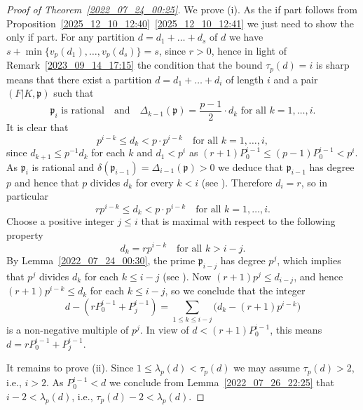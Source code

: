 \documentclass[12pt,reqno]{amsart}%
\theoremstyle{definition}
\newtheorem{rem}[prop]{Remark}
\theoremstyle{remark}
\newcommand{\ov}{\overline}
\newcommand{\pp}{\mathfrak{p}}
\newcommand{\de}{\delta}
\newcommand{\De}{\Delta}
\newcommand{\lam}{\lambda}
\begin{document}
\begin{proof}[Proof of Theorem~\ref{2022_07_24_00:25}]
We prove (i). As the if part follows from Proposition~\ref{2025_12_10_12:40}~\ref{2025_12_10_12:41} we just need to show the only if part.
For any partition
$ d = d_1 + \dots + d_s $
of $d$
we have $s+\min\{v_p(d_1),\dots,v_p(d_s)\}=s$,
since $r>0$,
hence in light of Remark~\ref{2023_09_14_17:15} 
the condition that the bound $\tau_p(d)=i$ is sharp means that there exist a partition
$ d = d_1 + \dots + d_i $
of length $i$ and a pair $(F|K,\pp)$ such that
\[ \text{$\pp_i$ is rational} \quad \text{and} \quad \De_{k-1}(\pp) = \frac{p-1}{2} \cdot d_{k} \text{ for all $k = 1,\dots,i$}. \]
It is clear that
\[ p^{i-k} \leq d_k < p \cdot p^{i-k} \quad \text{for all $k=1,\dots,i$}, \]
since $d_{k+1} \leq p^{-1} d_k$ for each $k$ and $d_1<p^i$ as $(r+1)P_0^{i-1} \leq (p-1)P_0^{i-1} < p^i$.
As $\pp_{i}$ is rational and $\de(\pp_{i-1})=\De_{i-1}(\pp) > 0$ we deduce that $\pp_{i-1}$ has degree $p$ and hence that $p$ divides $d_{k}$ for every $k<i$ (see \cite[Proposition~2.8]{HiSt22}).
Therefore $d_i=r$, so in particular
\[ r p^{i-k} \leq d_k < p \cdot p^{i-k} \quad \text{for all $k=1,\dots,i$.} \]
Choose a positive integer $j\leq i$ that is maximal with respect to the following property
\[ d_k = r p^{i-k} \quad \text{for all $k>i-j$.} \]
By Lemma~\ref{2022_07_24_00:30}, the prime $\pp_{i-j}$ has degree $p^j$,
which implies that $p^j$ divides $d_k$ for each $k \leq i-j$ (see \cite[Proposition~2.8]{HiSt22}). Now $(r+1) p^j \leq d_{i-j}$, and hence $(r+1) p^{i-k} \leq d_k$ for each $k\leq i-j$, so we conclude that the integer
\[ d - (r P_0^{i-1} + P_j^{i-1}) = \sum_{1\leq k \leq i-j} \big( d_k - (r+1) p^{i-k} \big) \]
is a non-negative multiple of $p^j$. In view of $d<(r+1)P_0^{i-1}$, this means  
$d = r P_0^{i-1} + P_j^{i-1}$.

It remains to prove (ii).
Since $1 \leq \lam_p(d) < \tau_p(d)$ %
we may assume $\tau_p(d)>2$, i.e., $i > 2$. 
As $P^{i-1}_0 < d$ we conclude from Lemma~\ref{2022_07_26_22:25} that $i-2 < \lam_p (d)$, i.e., $\tau_p(d)-2 < \lam_p (d)$.
\end{proof}

\end{document}
